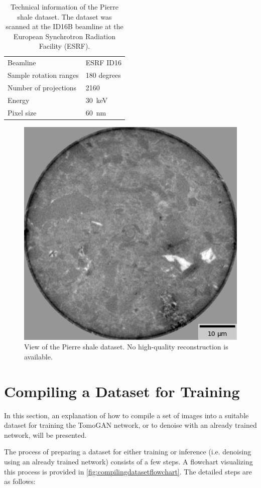 \begin{table}[htbp]
    \centering
    \caption[Technical information of the Pierre shale dataset]{Technical information of the Pierre shale dataset. The dataset was scanned at the ID16B beamline at the European Synchrotron Radiation Facility (ESRF). }
    \label{tab:pierreshale}
    \begin{tabular}{ll}
    \hline
    Beamline & ESRF ID16 \\
    Sample rotation ranges &  180 degrees\\
    Number of projections &  2160 \\
    Energy & \SI{30}{\kilo \electronvolt} \\
    Pixel size & \SI{60}{\nano \meter} \\
    \hline
    \end{tabular}
\end{table}

\begin{figure}[htbp]
    \centering
    \includegraphics[width=.45\textwidth]{figures/shalens.png}
    \caption[Pierre shale dataset]{View of the Pierre shale dataset. No high-quality reconstruction is available. }
    \label{fig:shaledataset}
  \end{figure}


\section{Compiling a Dataset for Training}
\label{sec:method:compilingdataset}
In this section, an explanation of how to compile a set of images into a suitable dataset for training the TomoGAN network, or to denoise with an already trained network, will be presented. 

The process of preparing a dataset for either training or inference (i.e. denoising using an already trained network) consists of a few steps. A flowchart visualizing this process is provided in \cref{fig:compilingdatasetflowchart}. The detailed steps are as follows:

